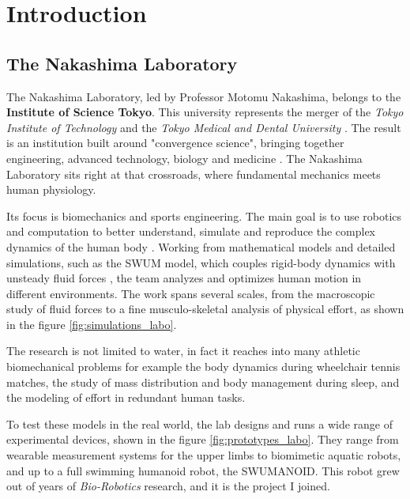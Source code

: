 \documentclass{tropLaClasse}
\begin{document}
\clearpage
\setcounter{page}{1} %
\pagestyle{plain}    %

\section{Introduction}

\subsection{The Nakashima Laboratory}

The Nakashima Laboratory, led by Professor Motomu Nakashima, belongs to the \textbf{Institute of Science Tokyo}. This university represents the merger of the \textit{Tokyo Institute of Technology} and the \textit{Tokyo Medical and Dental University} \cite{isct2024merger}. The result is an institution built around "convergence science", bringing together engineering, advanced technology, biology and medicine \cite{isct2024merger}. The Nakashima Laboratory sits right at that crossroads, where fundamental mechanics meets human physiology.

Its focus is biomechanics and sports engineering. The main goal is to use robotics and computation to better understand, simulate and reproduce the complex dynamics of the human body \cite{nakashimalab_website}. Working from mathematical models and detailed simulations, such as the SWUM model, which couples rigid-body dynamics with unsteady fluid forces \cite{nakashima2007swum}, the team analyzes and optimizes human motion in different environments. The work spans several scales, from the macroscopic study of fluid forces to a fine musculo-skeletal analysis of physical effort, as shown in the figure \ref{fig:simulations_labo}. \label{text:simulations_labo}



The research is not limited to water, in fact it reaches into many athletic biomechanical problems for example the body dynamics during wheelchair tennis matches, the study of mass distribution and body management during sleep, and the modeling of effort in redundant human tasks.



To test these models in the real world, the lab designs and runs a wide range of experimental devices, shown in the figure \ref{fig:prototypes_labo}. They range from wearable measurement systems for the upper limbs to biomimetic aquatic robots, and up to a full swimming humanoid robot, the SWUMANOID. This robot grew out of years of \textit{Bio-Robotics} research, and it is the project I joined. \label{text:prototypes_labo}
\end{document}
